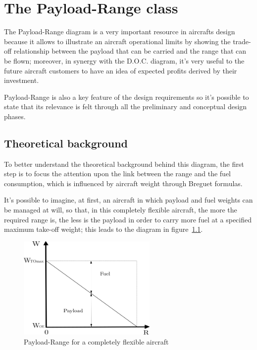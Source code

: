 \documentclass[a4paper,12pt,oneside]{book}
\begin{document}
\chapter{The Payload-Range class}
The Payload-Range diagram is a very important resource in aircrafts design because it allows to illustrate an aircraft operational limits by showing the trade-off relationship between the payload that can be carried and the range that can be flown; moreover, in synergy with the D.O.C. diagram, it’s very useful to the future aircraft customers to have an idea of expected profits derived by their investment.

Payload-Range is also a key feature of the design requirements so it’s possible to state that its relevance is felt through all the preliminary and conceptual design phases.

\section{Theoretical background}
To better understand the theoretical background behind this diagram, the first step is to focus the attention upon the link between the range and the fuel consumption, which is influenced by aircraft weight through Breguet formulas. 

It’s possible to imagine, at first, an aircraft in which payload and fuel weights can be managed at will, so that, in this completely flexible aircraft, the more the required range is, the less is the payload in order to carry more fuel at a specified maximum take-off weight; this leads to the diagram in figure~\ref{fig:Figure1}.

\begin{figure}[ht]
\centering
\includegraphics[keepaspectratio, width=0.6\textwidth]{Flexible_Payload_Range}
\caption{Payload-Range for a completely flexible aircraft}
\label{fig:Figure1}
\end{figure}
\end{document}
